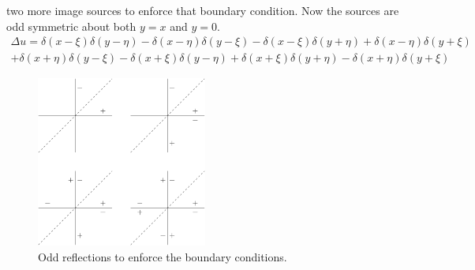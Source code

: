 {\begin{Solution}
\begin{enumerate}
    two more image sources to enforce that boundary condition.  Now the sources
    are odd symmetric about both $y = x$ and $y = 0$.
    \begin{multline*}
      \Delta u = \delta(x-\xi) \delta(y-\eta) - \delta(x-\eta) \delta(y-\xi) - \delta(x-\xi) \delta(y+\eta) + \delta(x-\eta) \delta(y+\xi)
      \\
      + \delta(x+\eta) \delta(y-\xi) - \delta(x+\xi) \delta(y-\eta) + \delta(x+\xi) \delta(y+\eta) - \delta(x+\eta) \delta(y+\xi) 
    \end{multline*}
    \begin{figure}[h!]
      \begin{center}
        \includegraphics[width=0.5\textwidth]{pde/conformal/sector_delta}
      \end{center}
      \caption{Odd reflections to enforce the boundary conditions.}
      \label{sector_delta}
    \end{figure}
  \end{enumerate}
\end{Solution}










}
